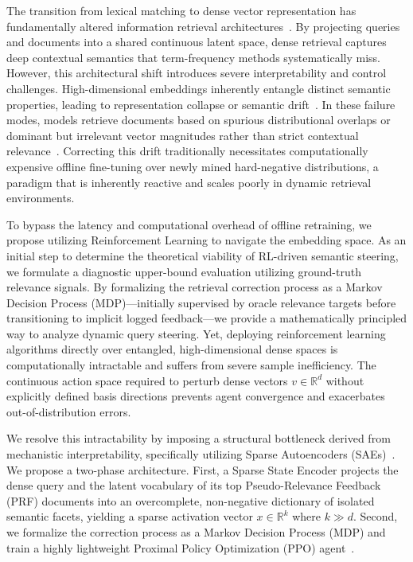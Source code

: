 The transition from lexical matching to dense vector representation has fundamentally altered information retrieval architectures~\citep{karpukhin2020, izacard2022}. By projecting queries and documents into a shared continuous latent space, dense retrieval captures deep contextual semantics that term-frequency methods systematically miss. However, this architectural shift introduces severe interpretability and control challenges. High-dimensional embeddings inherently entangle distinct semantic properties, leading to representation collapse or semantic drift~\citep{zhan2021}. In these failure modes, models retrieve documents based on spurious distributional overlaps or dominant but irrelevant vector magnitudes rather than strict contextual relevance~\citep{thakur2021}. Correcting this drift traditionally necessitates computationally expensive offline fine-tuning over newly mined hard-negative distributions, a paradigm that is inherently reactive and scales poorly in dynamic retrieval environments.

To bypass the latency and computational overhead of offline retraining, we propose utilizing Reinforcement Learning to navigate the embedding space. As an initial step to determine the theoretical viability of RL-driven semantic steering, we formulate a diagnostic upper-bound evaluation utilizing ground-truth relevance signals. By formalizing the retrieval correction process as a Markov Decision Process (MDP)—initially supervised by oracle relevance targets before transitioning to implicit logged feedback—we provide a mathematically principled way to analyze dynamic query steering. Yet, deploying reinforcement learning algorithms directly over entangled, high-dimensional dense spaces is computationally intractable and suffers from severe sample inefficiency. The continuous action space required to perturb dense vectors $v \in \mathbb{R}^d$ without explicitly defined basis directions prevents agent convergence and exacerbates out-of-distribution errors.

We resolve this intractability by imposing a structural bottleneck derived from mechanistic interpretability, specifically utilizing Sparse Autoencoders (SAEs)~\citep{cunningham2024, elhage2022, bricken2023}. We propose a two-phase architecture. First, a Sparse State Encoder projects the dense query and the latent vocabulary of its top Pseudo-Relevance Feedback (PRF) documents into an overcomplete, non-negative dictionary of isolated semantic facets, yielding a sparse activation vector $x \in \mathbb{R}^k$ where $k \gg d$. Second, we formalize the correction process as a Markov Decision Process (MDP) and train a highly lightweight Proximal Policy Optimization (PPO) agent~\citep{schulman2017}.

